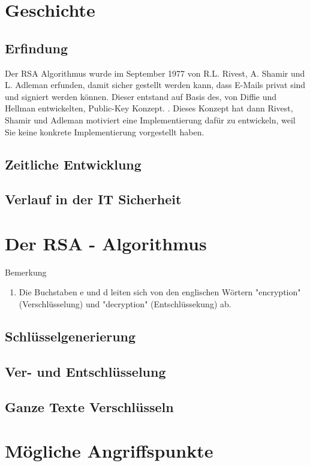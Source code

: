 \documentclass[14pt,a4paper]{scrartcl}
\begin{document}
\section{Geschichte}
	\subsection{Erfindung}
	Der RSA Algorithmus wurde im September 1977 von R.L. Rivest, A. Shamir und L. Adleman erfunden, damit sicher gestellt werden kann, dass E-Mails privat sind und signiert werden können. Dieser entstand auf Basis des, von Diffie und Hellman entwickelten, Public-Key Konzept. \cite{1055638}. Dieses Konzept hat dann Rivest, Shamir und Adleman motiviert eine Implementierung dafür zu entwickeln, weil Sie keine konkrete Implementierung vorgestellt haben. \cite[2]{rsaOriginalPaper} 

	\subsection{Zeitliche Entwicklung}
	\subsection{Verlauf in der IT Sicherheit}

\section{Der RSA - Algorithmus}

	Bemerkung
	\begin{enumerate}
	\item Die Buchstaben e und d leiten sich von den englischen Wörtern "encryption" (Verschlüsselung) und "decryption" (Entschlüssekung) ab.
		\end{enumerate}
		
	\subsection{Schlüsselgenerierung}
	\subsection{Ver- und Entschlüsselung}
	\subsection{Ganze Texte Verschlüsseln}

\section{Mögliche Angriffspunkte}
\end{document}
